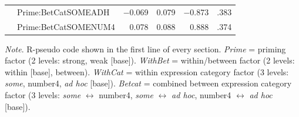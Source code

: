 \documentclass[10pt]{article}
\begin{document}
\begin{multicols}{2}
\begin{table}[ht]
\begin{center}
\begin{tabular}{llrrrr}
      & Prime:BetCatSOMEADH & \(-\)0.069 & 0.079 & \(-\)0.873 & .383 \\
      & Prime:BetCatSOMENUM4 & 0.078 & 0.088 & 0.888 & .374 \\
      \hline
    \end{tabular}
\end{center}
\emph{Note}. R-pseudo code shown in the first line of every section.
  \emph{Prime} = priming factor (2 levels: strong, weak [base]).
  \emph{WithBet} = within/between factor (2 levels: within [base], between).
  \emph{WithCat} = within expression category factor (3 levels: \emph{some}, number4, \emph{ad hoc} [base]).
  \emph{Betcat} = combined between expression category factor (3 levels: \emph{some} \(\leftrightarrow\) number4, \emph{some} \(\leftrightarrow\) \emph{ad hoc}, number4 \(\leftrightarrow\) \emph{ad hoc} [base]).
\end{table}


\end{multicols}
\end{document}
